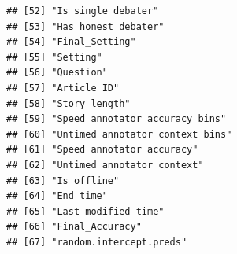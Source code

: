 \documentclass[
]{article}
\newenvironment{Shaded}{\begin{snugshade}}{\end{snugshade}}
\newcommand{\AttributeTok}[1]{\textcolor[rgb]{0.13,0.29,0.53}{#1}}
\newcommand{\FunctionTok}[1]{\textcolor[rgb]{0.13,0.29,0.53}{\textbf{#1}}}
\newcommand{\NormalTok}[1]{#1}
\newcommand{\OtherTok}[1]{\textcolor[rgb]{0.56,0.35,0.01}{#1}}
\newcommand{\SpecialCharTok}[1]{\textcolor[rgb]{0.81,0.36,0.00}{\textbf{#1}}}
\newcommand{\StringTok}[1]{\textcolor[rgb]{0.31,0.60,0.02}{#1}}
\begin{document}
\begin{verbatim}
## [52] "Is single debater"                      
## [53] "Has honest debater"                     
## [54] "Final_Setting"                          
## [55] "Setting"                                
## [56] "Question"                               
## [57] "Article ID"                             
## [58] "Story length"                           
## [59] "Speed annotator accuracy bins"          
## [60] "Untimed annotator context bins"         
## [61] "Speed annotator accuracy"               
## [62] "Untimed annotator context"              
## [63] "Is offline"                             
## [64] "End time"                               
## [65] "Last modified time"                     
## [66] "Final_Accuracy"                         
## [67] "random.intercept.preds"
\end{verbatim}

\begin{Shaded}
\end{Shaded}
\end{document}
